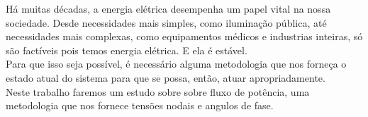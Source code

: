 \documentclass[Portugues,Final]{tese-FT}
\begin{document}
\paginasiniciais
\begin{resumo}

H\'a muitas d\'ecadas, a energia el\'etrica desempenha um papel vital na nossa sociedade. Desde necessidades mais simples, como ilumina\c{c}\~ao p\'ublica, at\'e necessidades mais complexas, como equipamentos m\'edicos e industrias inteiras, s\'o s\~ao fact\'iveis pois temos energia el\'etrica. E ela \'e est\'avel.\\
Para que isso seja poss\'ivel, \'e necess\'ario alguma metodologia que nos forne\c{c}a o estado atual do sistema para que se possa, ent\~ao, atuar apropriadamente.\\
Neste trabalho faremos um estudo sobre sobre fluxo de potência, uma metodologia que nos fornece tens\~oes nodais e angulos de fase.



\end{resumo}




\renewcommand{\nomname}{Lista de Abreviações e Siglas}
\printnomenclature[3cm]


\tableofcontents
\fimdaspaginasiniciais


%
%










%

%

\begin{singlespacing}
\setlength\bibitemsep{10pt}   %
\printbibliography[heading=bibintoc, %
                   title={Referências bibliográficas} %
                  ]
\end{singlespacing}


%
\end{document}
